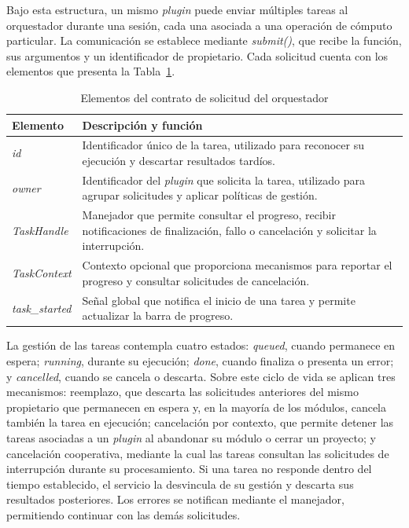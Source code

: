 \documentclass[12pt,letterpaper,oneside]{article}
\begin{document}
Bajo esta estructura, un mismo \textit{plugin} puede enviar múltiples tareas al orquestador durante una sesión, cada una asociada a una operación de cómputo particular. La comunicación se establece mediante \textit{submit()}, que recibe la función, sus argumentos y un identificador de propietario. Cada solicitud cuenta con los elementos que presenta la Tabla~\ref{tab:elementos-orquestador}.

\begin{table}[!htb]
  \centering
  \small{}
  \renewcommand{\arraystretch}{1.15}
  \begin{tabular}{|>{\raggedright\arraybackslash}p{3.2cm}|>{\raggedright\arraybackslash}p{11.3cm}|}
    \hline
    \textbf{Elemento} & \textbf{Descripción y función} \\ \hline
    \textit{id} & Identificador único de la tarea, utilizado para reconocer su ejecución y descartar resultados tardíos. \\ \hline
    \textit{owner} & Identificador del \textit{plugin} que solicita la tarea, utilizado para agrupar solicitudes y aplicar políticas de gestión. \\ \hline
    \textit{TaskHandle} & Manejador que permite consultar el progreso, recibir notificaciones de finalización, fallo o cancelación y solicitar la interrupción. \\ \hline
    \textit{TaskContext} & Contexto opcional que proporciona mecanismos para reportar el progreso y consultar solicitudes de cancelación. \\ \hline
    \textit{task\_started} & Señal global que notifica el inicio de una tarea y permite actualizar la barra de progreso. \\ \hline
  \end{tabular}
\caption{Elementos del contrato de solicitud del orquestador}
\label{tab:elementos-orquestador}
\end{table}

La gestión de las tareas contempla cuatro estados: \textit{queued}, cuando permanece en espera; \textit{running}, durante su ejecución; \textit{done}, cuando finaliza o presenta un error; y \textit{cancelled}, cuando se cancela o descarta. Sobre este ciclo de vida se aplican tres mecanismos: reemplazo, que descarta las solicitudes anteriores del mismo propietario que permanecen en espera y, en la mayoría de los módulos, cancela también la tarea en ejecución; cancelación por contexto, que permite detener las tareas asociadas a un \textit{plugin} al abandonar su módulo o cerrar un proyecto; y cancelación cooperativa, mediante la cual las tareas consultan las solicitudes de interrupción durante su procesamiento. Si una tarea no responde dentro del tiempo establecido, el servicio la desvincula de su gestión y descarta sus resultados posteriores. Los errores se notifican mediante el manejador, permitiendo continuar con las demás solicitudes.
\end{document}
